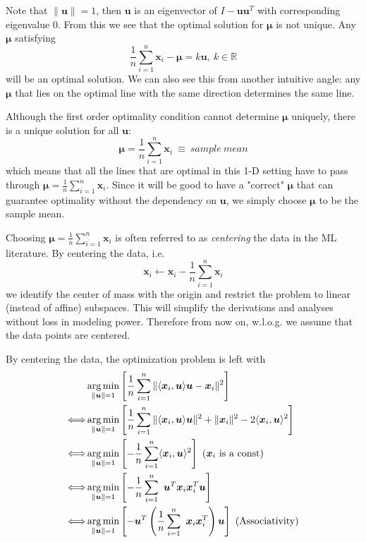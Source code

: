 \documentclass[../main.tex]{subfiles}
\begin{document}
Note that $\|\bm{u}\|=1$, then $\bm{u}$ is an eigenvector of $I-\bm{u}\bm{u}^T $ with corresponding eigenvalue $0$. From this we see that the optimal solution for $\bm{\mu}$ is not unique. Any $\bm{\mu}$ satisfying 
\begin{equation*}
\frac{1}{n}\sum_{i=1}^n\bm{x}_i-\bm{\mu} = k\bm{u},\ k\in \mathbb{R}
\end{equation*}
will be an optimal solution. We can also see this from another intuitive angle: any $\bm{\mu}$ that lies on the optimal line with the same direction determines the same line.
\par Although the first order optimality condition cannot determine $\bm{\mu}$ uniquely, there is a unique solution for all $\bm{u}$:
\begin{equation*}
\bm{\mu} = \frac{1}{n}\sum_{i=1}^n\bm{x}_i ~\equiv~ sample\ mean
\end{equation*}
which means that all the lines that are optimal in this 1-D setting have to pass through $ \bm{\mu} = \frac{1}{n}\sum_{i=1}^n\bm{x}_i$. Since it will be good to have a "correct" $\bm{\mu}$ that can guarantee optimality without the dependency on $\bm{u}$, we simply choose $\bm{\mu}$ to be the sample mean.
\par Choosing $\bm{\mu} = \frac{1}{n}\sum_{i=1}^n\bm{x}_i$ is often referred to as \emph{centering} the data in the ML literature. By centering the data, i.e.
\begin{equation*}
\bm{x}_i\leftarrow \bm{x}_i-\frac{1}{n}\sum_{i=1}^n\bm{x}_i
\end{equation*}
we identify the center of mass with the origin and restrict the problem to linear (instead of affine) subspaces. This will simplify the derivations and analyses without loss in modeling power. Therefore from now on, w.l.o.g. we assume that the data points are centered.
\par By centering the data, the optimization problem is left with
\begin{align}
&\mathop{\arg\min}_{\|\bm{u}\|=1} \left[ \frac{1}{n}\sum_{i=1}^n \|\langle \bm{x}_i,\bm{u}\rangle \bm{u} - \bm{x}_i\|^2 \right]\notag\\
\Longleftrightarrow &\mathop{\arg\min}_{\|\bm{u}\|=1} \left[ \frac{1}{n}\sum_{i=1}^n \|\langle \bm{x}_i,\bm{u}\rangle \bm{u}\|^2 + \|\bm{x}_i\|^2 - 2\langle \bm{x}_i,\bm{u}\rangle^2 \right]\notag\\
\Longleftrightarrow &\mathop{\arg\min}_{\|\bm{u}\|=1} \left[- \frac{1}{n}\sum_{i=1}^n\langle \bm{x}_i,\bm{u}\rangle^2 \right]\ (\bm{x}_i\text{ is a const})\notag\\
\Longleftrightarrow &\mathop{\arg\min}_{\|\bm{u}\|=1} \left[- \frac{1}{n}\sum_{i=1}^n\ \bm{u}^T\bm{x}_i\bm{x}_i^T\bm{u} \right]\notag\\
\label{eq_2_obj_u}\Longleftrightarrow &\mathop{\arg\min}_{\|\bm{u}\|=1} \left[- \bm{u}^T\left(\frac{1}{n}\sum_{i=1}^n\ \bm{x}_i\bm{x}_i^T\right)\bm{u} \right]\ (\text{Associativity})
\end{align}
\end{document}
